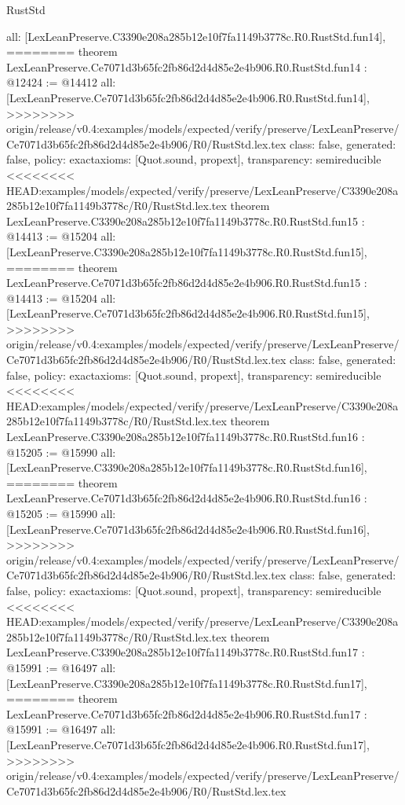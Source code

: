 \begin{lexlean}{RustStd}
\begin{coremodule}
{\begin{coremodule}
{{{{{{{{{{{{{{{{{  all: [LexLeanPreserve.C3390e208a285b12e10f7fa1149b3778c.R0.RustStd.fun14],
========
theorem LexLeanPreserve.Ce7071d3b65fc2fb86d2d4d85e2e4b906.R0.RustStd.fun14 : @12424 := @14412 {
  all: [LexLeanPreserve.Ce7071d3b65fc2fb86d2d4d85e2e4b906.R0.RustStd.fun14],
>>>>>>>> origin/release/v0.4:examples/models/expected/verify/preserve/LexLeanPreserve/Ce7071d3b65fc2fb86d2d4d85e2e4b906/R0/RustStd.lex.tex
  class: false,
  generated: false,
  policy: exact{axioms: [Quot.sound, propext]},
  transparency: semireducible
}
<<<<<<<< HEAD:examples/models/expected/verify/preserve/LexLeanPreserve/C3390e208a285b12e10f7fa1149b3778c/R0/RustStd.lex.tex
theorem LexLeanPreserve.C3390e208a285b12e10f7fa1149b3778c.R0.RustStd.fun15 : @14413 := @15204 {
  all: [LexLeanPreserve.C3390e208a285b12e10f7fa1149b3778c.R0.RustStd.fun15],
========
theorem LexLeanPreserve.Ce7071d3b65fc2fb86d2d4d85e2e4b906.R0.RustStd.fun15 : @14413 := @15204 {
  all: [LexLeanPreserve.Ce7071d3b65fc2fb86d2d4d85e2e4b906.R0.RustStd.fun15],
>>>>>>>> origin/release/v0.4:examples/models/expected/verify/preserve/LexLeanPreserve/Ce7071d3b65fc2fb86d2d4d85e2e4b906/R0/RustStd.lex.tex
  class: false,
  generated: false,
  policy: exact{axioms: [Quot.sound, propext]},
  transparency: semireducible
}
<<<<<<<< HEAD:examples/models/expected/verify/preserve/LexLeanPreserve/C3390e208a285b12e10f7fa1149b3778c/R0/RustStd.lex.tex
theorem LexLeanPreserve.C3390e208a285b12e10f7fa1149b3778c.R0.RustStd.fun16 : @15205 := @15990 {
  all: [LexLeanPreserve.C3390e208a285b12e10f7fa1149b3778c.R0.RustStd.fun16],
========
theorem LexLeanPreserve.Ce7071d3b65fc2fb86d2d4d85e2e4b906.R0.RustStd.fun16 : @15205 := @15990 {
  all: [LexLeanPreserve.Ce7071d3b65fc2fb86d2d4d85e2e4b906.R0.RustStd.fun16],
>>>>>>>> origin/release/v0.4:examples/models/expected/verify/preserve/LexLeanPreserve/Ce7071d3b65fc2fb86d2d4d85e2e4b906/R0/RustStd.lex.tex
  class: false,
  generated: false,
  policy: exact{axioms: [Quot.sound, propext]},
  transparency: semireducible
}
<<<<<<<< HEAD:examples/models/expected/verify/preserve/LexLeanPreserve/C3390e208a285b12e10f7fa1149b3778c/R0/RustStd.lex.tex
theorem LexLeanPreserve.C3390e208a285b12e10f7fa1149b3778c.R0.RustStd.fun17 : @15991 := @16497 {
  all: [LexLeanPreserve.C3390e208a285b12e10f7fa1149b3778c.R0.RustStd.fun17],
========
theorem LexLeanPreserve.Ce7071d3b65fc2fb86d2d4d85e2e4b906.R0.RustStd.fun17 : @15991 := @16497 {
  all: [LexLeanPreserve.Ce7071d3b65fc2fb86d2d4d85e2e4b906.R0.RustStd.fun17],
>>>>>>>> origin/release/v0.4:examples/models/expected/verify/preserve/LexLeanPreserve/Ce7071d3b65fc2fb86d2d4d85e2e4b906/R0/RustStd.lex.tex
}}}}}}}}}}}}}}}}}}}}}
\end{coremodule}}
\end{coremodule}
\end{lexlean}
